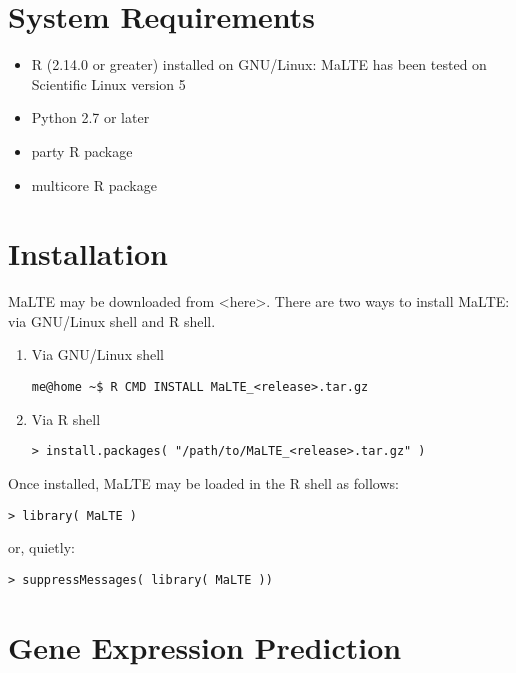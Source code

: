\documentclass[a4paper,12pt]{article}
\begin{document}
\section{System Requirements}
\begin{itemize}
\item R (2.14.0 or greater) installed on GNU/Linux: MaLTE has been tested on Scientific Linux version 5
\item Python 2.7 or later
\item party \textsf{R} package
\item multicore \textsf{R} package
\end{itemize}

\section{Installation}
MaLTE may be downloaded from \textless here\textgreater. There are two ways to install MaLTE: via GNU/Linux shell and R shell.

\begin{enumerate}
\item Via GNU/Linux shell
\begin{verbatim}
me@home ~$ R CMD INSTALL MaLTE_<release>.tar.gz
\end{verbatim}
\item Via R shell
\begin{verbatim}
> install.packages( "/path/to/MaLTE_<release>.tar.gz" )
\end{verbatim}
\end{enumerate}

Once installed, MaLTE may be loaded in the R shell as follows:
\begin{verbatim}
> library( MaLTE )
\end{verbatim}

or, quietly:

\begin{verbatim}
> suppressMessages( library( MaLTE ))
\end{verbatim}

\section{Gene Expression Prediction}
\end{document}
